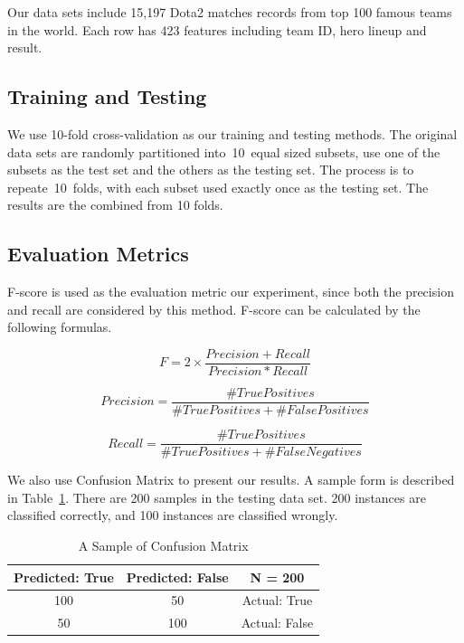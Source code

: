 \documentclass{article}
\begin{document}
Our data sets include 15,197 Dota2 matches records from top 100 famous teams in the world.
Each row has 423 features including team ID, hero lineup and result.

\subsection{Training and Testing}
We use 10-fold cross-validation as our training and testing methods.
The original data sets are randomly partitioned into 10 equal sized subsets, use one of the subsets as the test set and the others as the testing set.
The process is to repeate 10 folds, with each subset used exactly once as the testing set.
The results are the combined from 10 folds.


\subsection{Evaluation Metrics}
F-score is used as the evaluation metric our experiment, since both the precision and recall are considered by this method.
F-score can be calculated by the following formulas.


\begin{equation}
F=2\times\frac{Precision+Recall}{Precision*Recall}
\end{equation}

\begin{equation}
Precision = \frac{\#TruePositives}{\#TruePositives+\#FalsePositives}
\end{equation}

\begin{equation}
Recall = \frac{\#TruePositives}{\#TruePositives+\#FalseNegatives}
\end{equation}

We also use Confusion Matrix to present our results.
A sample form is described in Table~\ref{table:sample}.
There are 200 samples in the testing data set.
200 instances are classified correctly, and 100 instances are classified wrongly.

\begin{table}
\begin{center}
\begin{tabular}{|c|c|c|}
\hline
Predicted: True & Predicted: False & N = 200 \\ \hline
100 & 50 & Actual: True \\ \hline
50 & 100 & Actual: False \\ \hline
\end{tabular}
\caption{A Sample of Confusion Matrix}
\label{table:sample}
\end{center}
\end{table}
\end{document}
